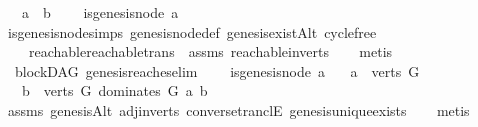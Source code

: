 \begin{isabellebody}
\ \ \ {\isachardoublequoteopen}a\ {\isasymrightarrow}\isactrlsup {\isacharplus}{\kern0pt}\ b{\isachardoublequoteclose}\isanewline
\ \ \ {\isachardoublequoteopen}{\isasymnot}\ is{\isacharunderscore}{\kern0pt}genesis{\isacharunderscore}{\kern0pt}node\ a{\isachardoublequoteclose}\isanewline
%
\isadelimproof
\ \ %
\endisadelimproof
%
\isatagproof
{}\isamarkupfalse%
\ is{\isacharunderscore}{\kern0pt}genesis{\isacharunderscore}{\kern0pt}node{\isachardot}{\kern0pt}simps\ genesis{\isacharunderscore}{\kern0pt}node{\isacharunderscore}{\kern0pt}def\ genesis{\isacharunderscore}{\kern0pt}existAlt\ cycle{\isacharunderscore}{\kern0pt}free\ \isanewline
\ \ \ \ reachable{}{\isacharunderscore}{\kern0pt}reachable{\isacharunderscore}{\kern0pt}trans\ \ assms\ reachable{}{\isacharunderscore}{\kern0pt}in{\isacharunderscore}{\kern0pt}verts{\isacharparenleft}{\kern0pt}{}{\isacharparenright}{\kern0pt}\isanewline
\ \ \isamarkupfalse%
\ {\isacharparenleft}{\kern0pt}metis{\isacharparenright}{\kern0pt}%
\endisatagproof
{\isafoldproof}%
%
\isadelimproof
\ \isanewline
%
\endisadelimproof
\isanewline
{}\isamarkupfalse%
\ {\isacharparenleft}{\kern0pt}\ blockDAG{\isacharparenright}{\kern0pt}\ genesis{\isacharunderscore}{\kern0pt}reaches{\isacharunderscore}{\kern0pt}elim{\isacharcolon}{\kern0pt}\isanewline
\ \ \ {\isachardoublequoteopen}{\isasymnot}\ is{\isacharunderscore}{\kern0pt}genesis{\isacharunderscore}{\kern0pt}node\ a{\isachardoublequoteclose}\isanewline
\ \ \ {\isachardoublequoteopen}a\ {\isasymin}\ verts\ G{\isachardoublequoteclose}\isanewline
\ \ \ {\isachardoublequoteopen}{\isasymexists}b\ {\isasymin}\ {\isacharparenleft}{\kern0pt}verts\ G{\isacharparenright}{\kern0pt}{\isachardot}{\kern0pt}\ dominates\ G\ a\ b{\isachardoublequoteclose}\isanewline
%
\isadelimproof
\ \ %
\endisadelimproof
%
\isatagproof
{}\isamarkupfalse%
\ assms\ genesisAlt{}\ adj{\isacharunderscore}{\kern0pt}in{\isacharunderscore}{\kern0pt}verts{\isacharparenleft}{\kern0pt}{}{\isacharparenright}{\kern0pt}\ converse{\isacharunderscore}{\kern0pt}tranclE\ genesis{\isacharunderscore}{\kern0pt}unique{\isacharunderscore}{\kern0pt}exists\isanewline
\ \ \isamarkupfalse%
\ metis%
\endisatagproof
{\isafoldproof}%
%
\isadelimproof
%
\endisadelimproof
%
\isadelimdocument
%
\endisadelimdocument
%
\isatagdocument
%
\isamarkuptrue%
%
\endisatagdocument

\end{isabellebody}

